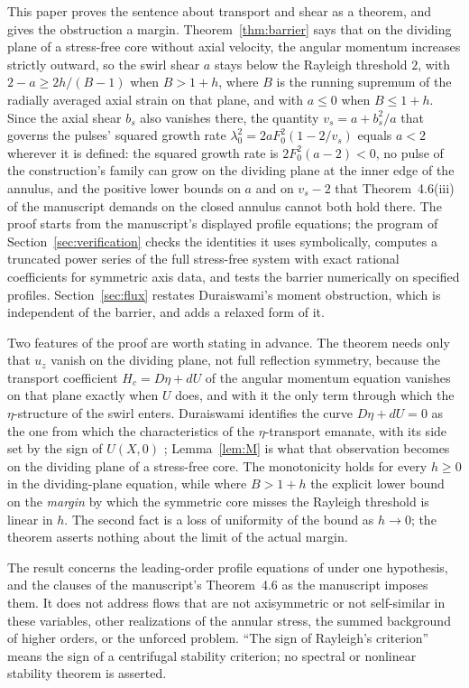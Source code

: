 \documentclass[11pt]{article}
\newcommand{\Hc}{H_c}
\newcommand{\bs}{b_s}
\newcommand{\vs}{v_s}
\begin{document}
This paper proves the sentence about transport and shear as a theorem, and gives the obstruction a margin. Theorem~\ref{thm:barrier} says that on the dividing plane of a stress-free core without axial velocity, the angular momentum increases strictly outward, so the swirl shear $a$ stays below the Rayleigh threshold $2$, with $2-a\ge 2h/(B-1)$ when $B>1+h$, where $B$ is the running supremum of the radially averaged axial strain on that plane, and with $a\le0$ when $B\le1+h$. Since the axial shear $\bs$ also vanishes there, the quantity $\vs=a+\bs^2/a$ that governs the pulses' squared growth rate $\lambda_0^2=2aF_0^2(1-2/\vs)$ \cite[p.~74]{OpenAINS} equals $a<2$ wherever it is defined: the squared growth rate is $2F_0^2(a-2)<0$, no pulse of the construction's family can grow on the dividing plane at the inner edge of the annulus, and the positive lower bounds on $a$ and on $\vs-2$ that Theorem~4.6(iii) of the manuscript demands on the closed annulus cannot both hold there. The proof starts from the manuscript's displayed profile equations; the program of Section~\ref{sec:verification} checks the identities it uses symbolically, computes a truncated power series of the full stress-free system with exact rational coefficients for symmetric axis data, and tests the barrier numerically on specified profiles. Section~\ref{sec:flux} restates Duraiswami's moment obstruction, which is independent of the barrier, and adds a relaxed form of it.

Two features of the proof are worth stating in advance. The theorem needs only that $u_z$ vanish on the dividing plane, not full reflection symmetry, because the transport coefficient $\Hc=D\eta+dU$ of the angular momentum equation vanishes on that plane exactly when $U$ does, and with it the only term through which the $\eta$-structure of the swirl enters. Duraiswami identifies the curve $D\eta+dU=0$ as the one from which the characteristics of the $\eta$-transport emanate, with its side set by the sign of $U(X,0)$ \cite[p.~6]{Duraiswami}; Lemma~\ref{lem:M} is what that observation becomes on the dividing plane of a stress-free core. The monotonicity holds for every $h\ge0$ in the dividing-plane equation, while where $B>1+h$ the explicit lower bound on the \emph{margin} by which the symmetric core misses the Rayleigh threshold is linear in $h$. The second fact is a loss of uniformity of the bound as $h\to0$; the theorem asserts nothing about the limit of the actual margin.

The result concerns the leading-order profile equations of \cite[Section~4]{OpenAINS} under one hypothesis, and the clauses of the manuscript's Theorem~4.6 as the manuscript imposes them. It does not address flows that are not axisymmetric or not self-similar in these variables, other realizations of the annular stress, the summed background of higher orders, or the unforced problem. ``The sign of Rayleigh's criterion'' means the sign of a centrifugal stability criterion; no spectral or nonlinear stability theorem is asserted.
\end{document}
